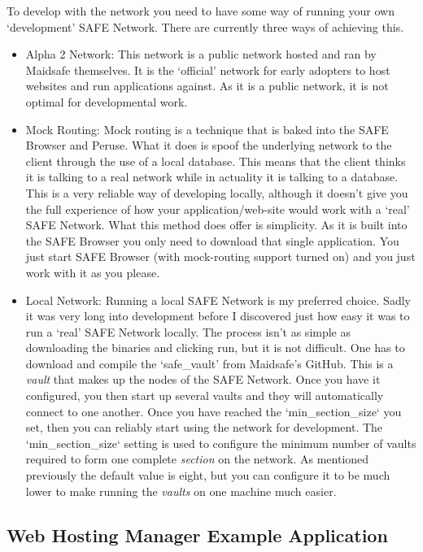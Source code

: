 To develop with the network you need to have some way of running your own `development' SAFE Network. There are currently three ways of achieving this.
\begin{itemize}
	\item Alpha 2 Network: This network is a public network hosted and ran by Maidsafe themselves. It is the `official' network for early adopters to host websites and run applications against. As it is a public network, it is not optimal for developmental work.
	\item Mock Routing: Mock routing is a technique that is baked into the SAFE Browser and Peruse. What it does is spoof the underlying network to the client through the use of a local database. This means that the client thinks it is talking to a real network while in actuality it is talking to a database. This is a very reliable way of developing locally, although it doesn't give you the full experience of how your application/web-site would work with a `real' SAFE Network. What this method does offer is simplicity. As it is built into the SAFE Browser you only need to download that single application. You just start SAFE Browser (with mock-routing support turned on) and you just work with it as you please.
	\item Local Network: Running a local SAFE Network is my preferred choice. Sadly it was very long into development before I discovered just how easy it was to run a `real' SAFE Network locally. The process isn't as simple as downloading the binaries and clicking run, but it is not difficult. One has to download and compile the `safe\_vault' from Maidsafe's GitHub. This is a \textit{vault} that makes up the nodes of the SAFE Network. Once you have it configured, you then start up several vaults and they will automatically connect to one another. Once you have reached the `min\_section\_size` you set, then you can reliably start using the network for development. The `min\_section\_size` setting is used to configure the minimum number of vaults required to form one complete \textit{section} on the network. As mentioned previously the default value is eight, but you can configure it to be much lower to make running the \textit{vaults} on one machine much easier.
\end{itemize}

\subsection{Web Hosting Manager Example Application}

